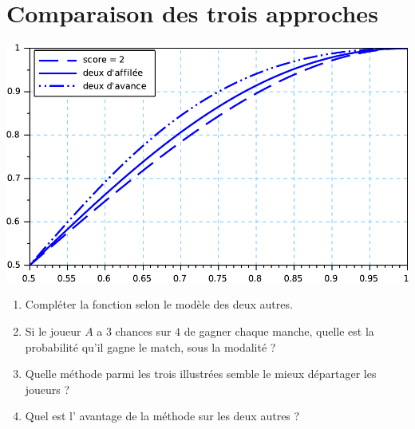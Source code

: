 \documentclass[12pt]{article}
\begin{document}
\section{Comparaison des trois approches}

\begin{objetGauche}
  \begin{minipage}[t]{7cm}
    
    \includegraphics[width=\linewidth]{comparaisonDesTroisGrille.pdf}
  \end{minipage}
  \finObjet
  
\end{objetGauche}
\begin{enumerate}[resume]
  \item Compléter  la fonction  selon le modèle des deux autres.
  \item Si le joueur $A$ a 3 chances sur $4$ de gagner chaque manche, quelle est la probabilité qu'il gagne le match, sous la modalité  ?
  \item Quelle méthode parmi les trois illustrées semble le mieux départager les joueurs ?
  \item Quel est l' avantage  de la méthode  sur les deux autres ?
\end{enumerate}
\end{document}
